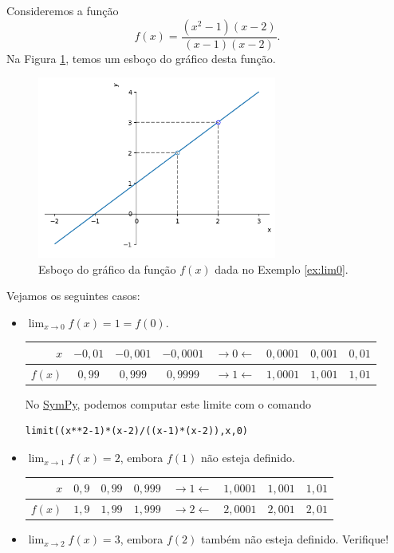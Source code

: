 \begin{ex}\label{ex:lim0}
  Consideremos a função
  \begin{equation}
    f(x) = \frac{(x^2-1)(x-2)}{(x-1)(x-2)}.
  \end{equation}
  Na Figura \ref{fig:ex_lim0}, temos um esboço do gráfico desta função.

  \begin{figure}[H]
    \centering
    \includegraphics[width=0.7\textwidth]{./cap_lim/dados/fig_ex_lim0/fig_ex_lim0}
    \caption{Esboço do gráfico da função $f(x)$ dada no Exemplo \ref{ex:lim0}.}
    \label{fig:ex_lim0}
  \end{figure}


  Vejamos os seguintes casos:
  \begin{itemize}
  \item $\displaystyle \lim_{x\to 0} f(x) = 1 = f(0)$.
    
    \begin{tabular}{r|ccc|c|ccc}
      $x$ & $-0,01$ & $-0,001$ & $-0,0001$ & $\rightarrow 0 \leftarrow$ & $0,0001$ & $0,001$ & $0,01$\\\hline
      $f(x)$ & $0,99$ & $0,999$ & $0,9999$ & $\rightarrow 1 \leftarrow$ & $1,0001$ & $1,001$ & $1,01$
    \end{tabular}

    \ifispython
    No \href{https://www.sympy.org}{SymPy}, podemos computar este limite com o comando
\begin{verbatim}
limit((x**2-1)*(x-2)/((x-1)*(x-2)),x,0)
\end{verbatim}
    \fi
  \item $\displaystyle \lim_{x\to 1} f(x) = 2$, embora $f(1)$ não esteja definido.
    
    \begin{tabular}{r|ccc|c|ccc}
      $x$ & $0,9$ & $0,99$ & $0,999$ & $\rightarrow 1 \leftarrow$ & $1,0001$ & $1,001$ & $1,01$\\\hline
      $f(x)$ & $1,9$ & $1,99$ & $1,999$ & $\rightarrow 2 \leftarrow$ & $2,0001$ & $2,001$ & $2,01$
    \end{tabular}
  \item $\displaystyle \lim_{x\to 2} f(x) = 3$, embora $f(2)$ também não esteja definido. Verifique!
  \end{itemize}
\end{ex}

